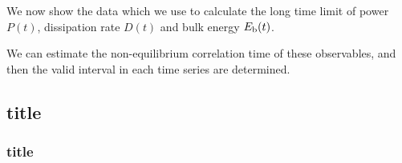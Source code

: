 We now show the data which we use to calculate the long time limit of power  $P(t)$, dissipation rate $D(t)$ and bulk energy $E_{\rm b}(t)$.

We can estimate the non-equilibrium correlation time of these observables, and then the valid interval in each time series are determined.

\subsection{title}

\subsubsection{title}

\begin{figure}[htbp]
	\centering
\end{figure}